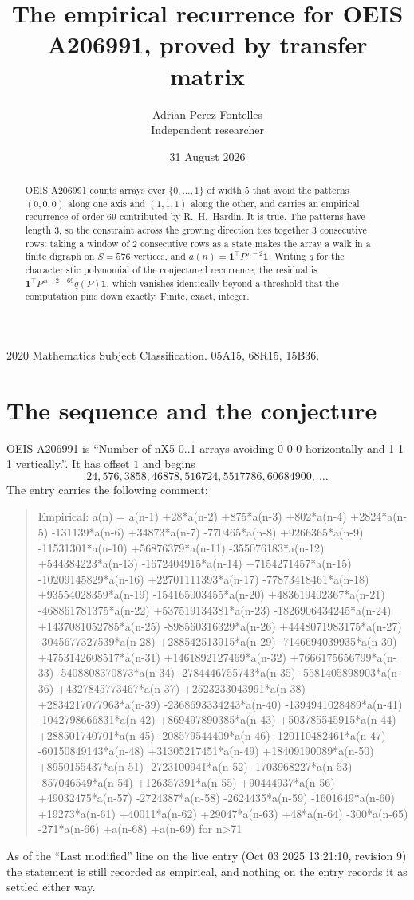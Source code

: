 \documentclass[11pt,a4paper]{article}
\title{The empirical recurrence for OEIS A206991, proved by transfer matrix}
\author{Adrian Perez Fontelles\\ \small Independent researcher}
\date{31 August 2026}
\theoremstyle{plain}
\theoremstyle{definition}
\begin{document}
\maketitle

\begin{abstract}
OEIS A206991 counts arrays over $\{0,\dots,1\}$ of width $5$ that avoid the patterns
$(0,0,0)$ along one axis and $(1,1,1)$ along the other, and carries an empirical recurrence of
order $69$ contributed by R.~H.~Hardin. It is true. The patterns have length $3$, so
the constraint across the growing direction ties together $3$ consecutive rows: taking a
window of $2$ consecutive rows as a state makes the array a walk in a finite digraph
on $S=576$ vertices, and $a(n)=\mathbf{1}^{\!\top}P^{\,n-2}\mathbf{1}$. Writing $q$
for the characteristic polynomial of the conjectured recurrence, the residual is
$\mathbf{1}^{\!\top}P^{\,n-2-69}q(P)\mathbf{1}$, which vanishes identically
beyond a threshold that the computation pins down exactly. Finite, exact, integer.
\end{abstract}

\noindent\small 2020 Mathematics Subject Classification. 05A15, 68R15, 15B36.\normalsize

\section{The sequence and the conjecture}

OEIS A206991 is ``Number of nX5 0..1 arrays avoiding 0 0 0 horizontally and 1 1 1 vertically.''. It has offset
$1$ and begins
\[
24, 576, 3858, 46878, 516724, 5517786, 60684900,\ \dots
\]
The entry carries the following comment:
\begin{quote}\small
Empirical: a(n) = a(n-1) +28*a(n-2) +875*a(n-3) +802*a(n-4) +2824*a(n-5) -131139*a(n-6) +34873*a(n-7) -770465*a(n-8) +9266365*a(n-9) -11531301*a(n-10) +56876379*a(n-11) -355076183*a(n-12) +544384223*a(n-13) -1672404915*a(n-14) +7154271457*a(n-15) -10209145829*a(n-16) +22701111393*a(n-17) -77873418461*a(n-18) +93554028359*a(n-19) -154165003455*a(n-20) +483619402367*a(n-21) -468861781375*a(n-22) +537519134381*a(n-23) -1826906434245*a(n-24) +1437081052785*a(n-25) -898560316329*a(n-26) +4448071983175*a(n-27) -3045677327539*a(n-28) +288542513915*a(n-29) -7146694039935*a(n-30) +4753142608517*a(n-31) +1461892127469*a(n-32) +7666175656799*a(n-33) -5408808370873*a(n-34) -2784446755743*a(n-35) -5581405898903*a(n-36) +4327845773467*a(n-37) +2523233043991*a(n-38) +2834217077963*a(n-39) -2368693334243*a(n-40) -1394941028489*a(n-41) -1042798666831*a(n-42) +869497890385*a(n-43) +503785545915*a(n-44) +288501740701*a(n-45) -208579544409*a(n-46) -120110482461*a(n-47) -60150849143*a(n-48) +31305217451*a(n-49) +18409190089*a(n-50) +8950155437*a(n-51) -2723100941*a(n-52) -1703968227*a(n-53) -857046549*a(n-54) +126357391*a(n-55) +90444937*a(n-56) +49032475*a(n-57) -2724387*a(n-58) -2624435*a(n-59) -1601649*a(n-60) +19273*a(n-61) +40011*a(n-62) +29047*a(n-63) +48*a(n-64) -300*a(n-65) -271*a(n-66) +a(n-68) +a(n-69) for n>71
\end{quote}
As of the ``Last modified'' line on the live entry (Oct 03 2025 13:21:10, revision
9) the statement is still recorded as empirical, and nothing on the entry
records it as settled either way.
\end{document}
